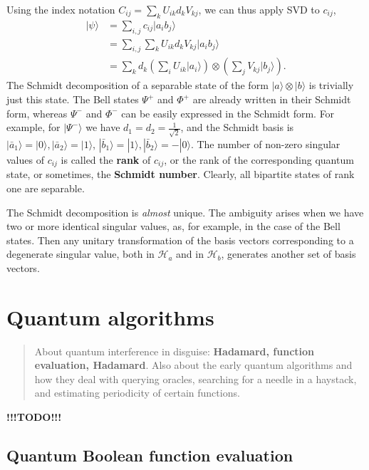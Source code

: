 \documentclass[fleqn]{article}
\let\oldsection\section
\renewcommand\section{\clearpage\oldsection}
\begin{document}
Using the index notation \(C_{ij} = \sum_k U_{ik}d_k V_{kj}\), we can thus apply SVD to \(c_{ij}\),
\[
  \begin{aligned}
    |\psi\rangle
    &= \sum_{i,j} c_{ij}|a_ib_j\rangle
  \\&= \sum_{i,j} \sum_k U_{ik}d_k V_{kj}|a_ib_j\rangle
  \\&= \sum_k d_k \left(\sum_i U_{ik}|a_i\rangle\right)\otimes\left(\sum_j V_{kj}|b_j\rangle\right).
  \end{aligned}
\]
The Schmidt decomposition of a separable state of the form
\(|a\rangle\otimes|b\rangle\) is trivially just this state.
The Bell states \(\Psi^+\) and \(\Phi^+\) are already written in their Schmidt form, whereas \(\Psi^-\) and \(\Phi^-\) can be easily expressed in the Schmidt form.
For example, for \(|\Psi^-\rangle\) we have \(d_1 = d_2 = \frac{1}{\sqrt 2}\), and the Schmidt basis is \(|\bar a_1\rangle =|0\rangle, |\bar a_2\rangle=|1\rangle\), \(|\bar b_1\rangle = |1\rangle, |\bar b_2\rangle=-|0\rangle\).
The number of non-zero singular values of \(c_{ij}\) is called the \textbf{rank} of \(c_{ij}\), or the rank of the corresponding quantum state, or sometimes, the \textbf{Schmidt number}.
Clearly, all bipartite states of rank one are separable.

The Schmidt decomposition is \emph{almost} unique.
The ambiguity arises when we have two or more identical singular values, as, for example, in the case of the Bell states.
Then any unitary transformation of the basis vectors corresponding to a degenerate singular value, both in \(\mathcal{H}_a\) and in \(\mathcal{H}_b\), generates another set of basis vectors.

\hypertarget{chapter6}{%
\section{Quantum algorithms}\label{chapter6}}

\begin{quote}
About quantum interference in disguise: \textbf{Hadamard, function evaluation, Hadamard}.
Also about the early quantum algorithms and how they deal with querying oracles, searching for a needle in a haystack, and estimating periodicity of certain functions.
\end{quote}

\textbf{!!!TODO!!!}

\hypertarget{quantum-boolean-function-evaluation}{%
\subsection{Quantum Boolean function evaluation}\label{quantum-boolean-function-evaluation}}
\end{document}
